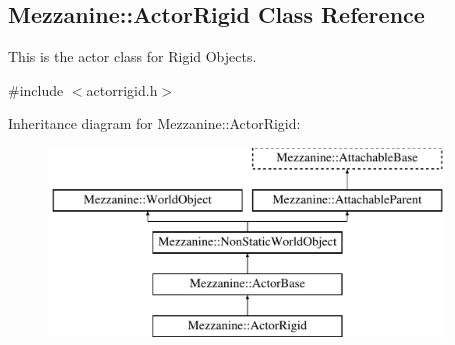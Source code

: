 \hypertarget{classMezzanine_1_1ActorRigid}{
\subsection{Mezzanine::ActorRigid Class Reference}
\label{classMezzanine_1_1ActorRigid}
}


This is the actor class for Rigid Objects.  




{\ttfamily \#include $<$actorrigid.h$>$}

Inheritance diagram for Mezzanine::ActorRigid:\begin{figure}[H]
\begin{center}
\leavevmode
\includegraphics[height=5.000000cm]{classMezzanine_1_1ActorRigid}
\end{center}
\end{figure}
